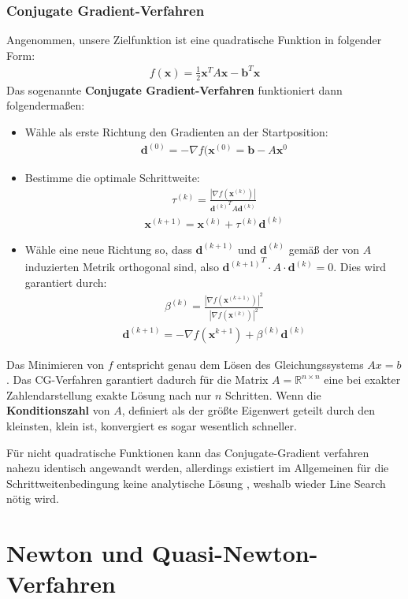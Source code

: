 \documentclass{report}
\newcommand{\tbf}{\textbf}
\newcommand{\xk}{\bm{x}^{(k)}}
\newcommand{\dk}{\bm{d}^{(k)}}
\newcommand{\tauk}{\tau^{(k)}}
\newcommand*{\newpar}{\par\vspace{\baselineskip}\noindent}
\begin{document}
\subsection{Conjugate Gradient-Verfahren}
Angenommen, unsere Zielfunktion ist eine quadratische Funktion in folgender Form:
\begin{align}
 f(\bm{x}) = \frac{1}{2}\bm{x}^T A \bm{x} - \bm{b}^T \bm{x}
\end{align}
Das sogenannte \tbf{Conjugate Gradient-Verfahren} funktioniert dann folgendermaßen:
\begin{itemize}
 \item Wähle als erste Richtung den Gradienten an der Startposition:
\begin{align*}
 \bm{d}^{(0)} = - \nabla f(\bm{x}^{(0)} = \bm{b} - A \bm{x}^0
\end{align*}
 \item Bestimme die optimale Schrittweite:
\begin{align*}
 \tauk = \frac{|\nabla f(\xk)|}{{\dk}^T A \dk}
\end{align*}
\begin{align*}
 \bm{x}^{(k+1)} = \xk + \tauk \dk
\end{align*}
 \item Wähle eine neue Richtung so, dass $\bm{d}^{(k+1)}$ und $\dk$ gemäß der von $A$ induzierten Metrik orthogonal sind, also ${\bm{d}^{(k+1)}}^T \cdot A \cdot \dk = 0$. Dies wird garantiert durch:
\begin{align*}
 \beta^{(k)} = \frac{|\nabla f(\bm{x}^{(k+1)})|^2}{|\nabla f(\xk)|^2}
\end{align*}
\begin{align*}
 \bm{d}^{(k+1)} = - \nabla f(\bm{x}^{k+1}) + \beta^{(k)} \dk
\end{align*}
\end{itemize}
Das Minimieren von $f$ entspricht genau dem Lösen des Gleichungssystems $Ax = b$. Das CG-Verfahren garantiert dadurch für die Matrix $A = \mathbb{R}^{n \times n}$ eine bei exakter Zahlendarstellung exakte Lösung nach nur $n$ Schritten. Wenn die \tbf{Konditionszahl} von $A$, definiert als der größte Eigenwert geteilt durch den kleinsten, klein ist, konvergiert es sogar wesentlich schneller.
\newpar
Für nicht quadratische Funktionen kann das Conjugate-Gradient verfahren nahezu identisch angewandt werden, allerdings existiert im Allgemeinen für die Schrittweitenbedingung keine analytische Lösung , weshalb wieder Line Search nötig wird.
%
\chapter{Newton und Quasi-Newton-Verfahren}
\end{document}
